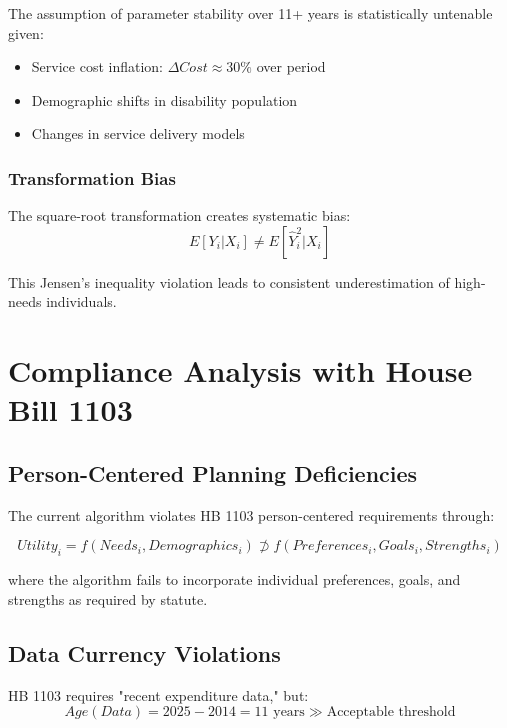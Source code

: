 \documentclass[12pt]{article}
\begin{document}
The assumption of parameter stability over 11+ years is statistically untenable given:
\begin{itemize}
    \item Service cost inflation: $\Delta Cost \approx 30\%$ over period
    \item Demographic shifts in disability population
    \item Changes in service delivery models
\end{itemize}

\subsubsection{Transformation Bias}
The square-root transformation creates systematic bias:
\begin{equation}
E[Y_i | X_i] \neq E[\hat{Y}_i^2 | X_i]
\end{equation}

This Jensen's inequality violation leads to consistent underestimation of high-needs individuals.

\section{Compliance Analysis with House Bill 1103}

\subsection{Person-Centered Planning Deficiencies}

The current algorithm violates HB 1103 person-centered requirements through:

\begin{equation}
Utility_i = f(Needs_i, Demographics_i) \not\supset f(Preferences_i, Goals_i, Strengths_i)
\end{equation}

where the algorithm fails to incorporate individual preferences, goals, and strengths as required by statute.

\subsection{Data Currency Violations}

HB 1103 requires "recent expenditure data," but:
\begin{equation}
Age(Data) = 2025 - 2014 = 11 \text{ years} \gg \text{Acceptable threshold}
\end{equation}
\end{document}
